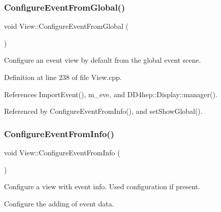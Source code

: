 \hypertarget{class_d_d4hep_1_1_view_a70d3dfc35cf31c58c5d6e1d1385d1b56}{}\label{class_d_d4hep_1_1_view_a70d3dfc35cf31c58c5d6e1d1385d1b56} 
\subsubsection{\texorpdfstring{Configure\+Event\+From\+Global()}{ConfigureEventFromGlobal()}}
{\footnotesize\ttfamily void View\+::\+Configure\+Event\+From\+Global (\begin{DoxyParamCaption}{ }\end{DoxyParamCaption})\hspace{0.3cm}{\ttfamily [virtual]}}



Configure an event view by default from the global event scene. 



Definition at line 238 of file View.\+cpp.



References Import\+Event(), m\+\_\+eve, and D\+D4hep\+::\+Display\+::manager().



Referenced by Configure\+Event\+From\+Info(), and set\+Show\+Global().

\hypertarget{class_d_d4hep_1_1_view_a1c4ddbce48cb4e389a8d515a4644773b}{}\label{class_d_d4hep_1_1_view_a1c4ddbce48cb4e389a8d515a4644773b} 
\subsubsection{\texorpdfstring{Configure\+Event\+From\+Info()}{ConfigureEventFromInfo()}}
{\footnotesize\ttfamily void View\+::\+Configure\+Event\+From\+Info (\begin{DoxyParamCaption}{ }\end{DoxyParamCaption})\hspace{0.3cm}{\ttfamily [virtual]}}



Configure a view with event info. Used configuration if present. 

Configure the adding of event data. 

